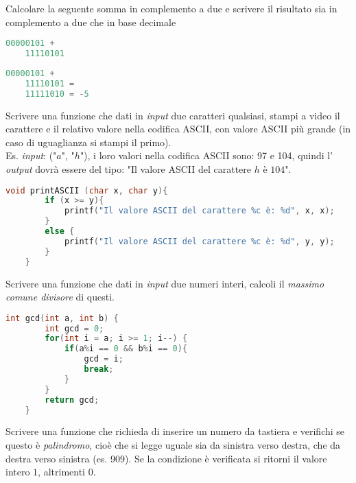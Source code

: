 \documentclass[addpoints,11pt]{exam}
\begin{document}
\begin{questions}
\question[2]
Calcolare la seguente somma in complemento a due e scrivere il risultato sia in complemento a due che in base decimale

\begin{minipage}[t]{0.5\linewidth}
	\begin{lstlisting}[language=C]
	00000101 +
	11110101\end{lstlisting}
\end{minipage}
\begin{minipage}[t]{0.5\linewidth}
	\begin{lstlisting}[language=C]
	00000101 +
	11110101 =
	11111010 = -5
	\end{lstlisting}
\end{minipage}



\question[1]
Scrivere una funzione che dati in \emph{input} due caratteri qualsiasi, stampi a video il carattere e il relativo valore nella codifica ASCII, con valore ASCII più grande (in caso di uguaglianza si stampi il primo). \\
Es. \emph{input}: ("$a$", "$h$"), i loro valori nella codifica ASCII sono: 97 e 104, quindi l' \emph{output} dovrà essere del tipo: "Il valore ASCII del carattere $h$ è $104$".

\begin{minipage}[t]{0.5\linewidth}
	\begin{lstlisting}[language=C]
	void printASCII (char x, char y){
		if (x >= y){
			printf("Il valore ASCII del carattere %c è: %d", x, x);    
		}
		else {
			printf("Il valore ASCII del carattere %c è: %d", y, y);    
		}
	}
	\end{lstlisting}
\end{minipage}



\question[3]
Scrivere una funzione che dati in \emph{input} due numeri interi, calcoli il \emph{massimo comune divisore} di questi.

\begin{minipage}[t]{0.5\linewidth}
	\begin{lstlisting}[language=C]
	int gcd(int a, int b) {
		int gcd = 0;
		for(int i = a; i >= 1; i--) {
			if(a%i == 0 && b%i == 0){ 
				gcd = i;
				break;
			}
		}
		return gcd;
	}
	\end{lstlisting}
\end{minipage}



\question[3]
Scrivere una funzione che richieda di inserire un numero da tastiera e verifichi se questo è \emph{palindromo}, cioè che si legge uguale sia da sinistra verso destra, che da destra verso sinistra (es. 909). Se la condizione è verificata si ritorni il valore intero $1$, altrimenti $0$.



\end{questions}
\end{document}

